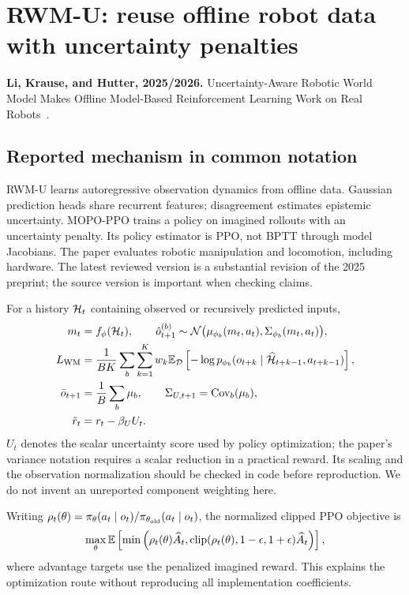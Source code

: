 \section{RWM-U: reuse offline robot data with uncertainty penalties}\label{sec:rwmu}
\textbf{Li, Krause, and Hutter, 2025/2026.} Uncertainty-Aware Robotic World
Model Makes Offline Model-Based Reinforcement Learning Work on Real Robots~\cite{rwmu}.

\subsection{Reported mechanism in common notation}
RWM-U learns autoregressive observation dynamics from offline data. Gaussian
prediction heads share recurrent features; disagreement estimates epistemic
uncertainty. MOPO-PPO trains a policy on imagined rollouts with an uncertainty
penalty. Its policy estimator is PPO, not BPTT through model Jacobians. The
paper evaluates robotic manipulation and locomotion, including hardware.
The latest reviewed version is a substantial revision of the 2025 preprint;
the source version is important when checking claims.

For a history $\mathcal H_t$ containing observed or recursively predicted inputs,
\begin{align}
m_t&=f_\phi(\mathcal H_t),\qquad
\hat o_{t+1}^{(b)}\sim\mathcal N\big(\mu_{\phi_b}(m_t,a_t),\Sigma_{\phi_b}(m_t,a_t)\big),\\
L_{\rm WM}&=\frac1{BK}\sum_b\sum_{k=1}^Kw_k
\mathbb E_{\mathcal D}\left[-\log p_{\phi_b}(o_{t+k}\mid\widehat{\mathcal H}_{t+k-1},a_{t+k-1})\right],\\
\bar o_{t+1}&=\frac1B\sum_b\mu_b,\qquad
\Sigma_{U,t+1}=\operatorname{Cov}_b(\mu_b),\\
\tilde r_t&=r_t-\beta_U U_t.
\end{align}
$U_t$ denotes the scalar uncertainty score used by policy optimization; the
paper's variance notation requires a scalar reduction in a practical reward.
Its scaling and the observation normalization should be checked in code before
reproduction. We do not invent an unreported component weighting here.

Writing $\rho_t(\theta)=\pi_\theta(a_t\mid o_t)/\pi_{\theta_{\rm old}}(a_t\mid o_t)$,
the normalized clipped PPO objective is
\begin{equation}\label{eq:ppo}
\max_\theta\mathbb E\left[\min\left(\rho_t(\theta)\widehat A_t,
\operatorname{clip}(\rho_t(\theta),1-\epsilon,1+\epsilon)\widehat A_t\right)\right],
\end{equation}
where advantage targets use the penalized imagined reward. This explains the
optimization route without reproducing all implementation coefficients.

